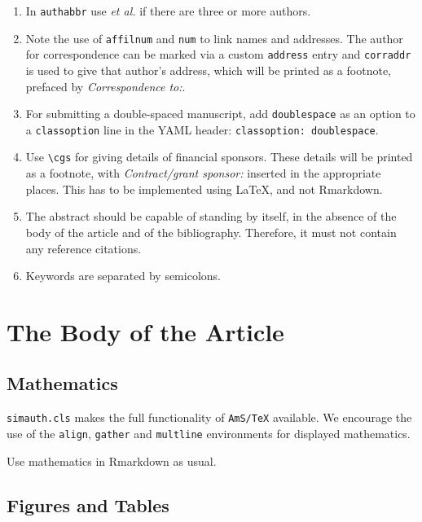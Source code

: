 \documentclass[times,]{simauth}
\begin{document}
\begin{enumerate}
\def\labelenumi{\arabic{enumi}.}
\item
  In \texttt{authabbr} use \emph{et al.} if there are three or more
  authors.
\item
  Note the use of \texttt{affilnum} and \texttt{num} to link names and
  addresses. The author for correspondence can be marked via a custom
  \texttt{address} entry and \texttt{corraddr} is used to give that
  author's address, which will be printed as a footnote, prefaced by
  \emph{Correspondence to:}.
\item
  For submitting a double-spaced manuscript, add \texttt{doublespace} as
  an option to a \texttt{classoption} line in the YAML header:
  \texttt{classoption:\ doublespace}.
\item
  Use \texttt{\textbackslash{}cgs} for giving details of financial
  sponsors. These details will be printed as a footnote, with
  \emph{Contract/grant sponsor:} inserted in the appropriate places.
  This has to be implemented using \LaTeX, and not Rmarkdown.
\item
  The abstract should be capable of standing by itself, in the absence
  of the body of the article and of the bibliography. Therefore, it must
  not contain any reference citations.
\item
  Keywords are separated by semicolons.
\end{enumerate}

\section{The Body of the Article}\label{the-body-of-the-article}

\subsection{Mathematics}\label{mathematics}

\texttt{simauth.cls} makes the full functionality of \texttt{AmS/TeX}
available. We encourage the use of the \texttt{align}, \texttt{gather}
and \texttt{multline} environments for displayed mathematics.

Use mathematics in Rmarkdown as usual.

\subsection{Figures and Tables}\label{figures-and-tables}
\end{document}
